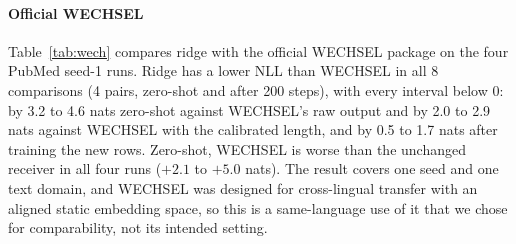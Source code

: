 \documentclass[preprint,12pt]{elsarticle}
\begin{document}
\paragraph{Official WECHSEL} Table~\ref{tab:wech} compares ridge with the official WECHSEL package on the four PubMed seed-1 runs. Ridge has a lower NLL than WECHSEL in all 8 comparisons (4 pairs, zero-shot and after 200 steps), with every interval below 0: by 3.2 to 4.6 nats zero-shot against WECHSEL's raw output and by 2.0 to 2.9 nats against WECHSEL with the calibrated length, and by 0.5 to 1.7 nats after training the new rows. Zero-shot, WECHSEL is worse than the unchanged receiver in all four runs ($+2.1$ to $+5.0$ nats). The result covers one seed and one text domain, and WECHSEL was designed for cross-lingual transfer with an aligned static embedding space, so this is a same-language use of it that we chose for comparability, not its intended setting.
\begin{table}[t]
\centering\small
\caption{Official WECHSEL against ridge, PubMed seed 1 (NLL per sentence in nats; negative in the first two columns = ridge better). Intervals are 95\,\% paired bootstrap; $^{*}$ excludes 0.}
\label{tab:wech}
\resizebox{\textwidth}{!}{}
\end{table}
\end{document}
